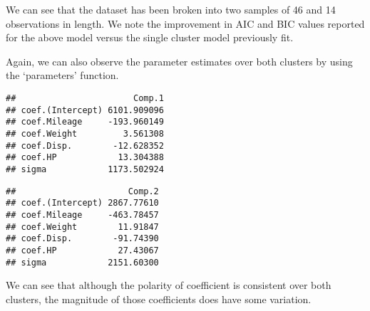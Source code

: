 \documentclass[]{article}
\begin{document}
We can see that the dataset has been broken into two samples of 46 and
14 observations in length. We note the improvement in AIC and BIC values
reported for the above model versus the single cluster model previously
fit.

Again, we can also observe the parameter estimates over both clusters by
using the `parameters' function.

\begin{verbatim}
##                       Comp.1
## coef.(Intercept) 6101.909096
## coef.Mileage     -193.960149
## coef.Weight         3.561308
## coef.Disp.        -12.628352
## coef.HP            13.304388
## sigma            1173.502924
\end{verbatim}

\begin{verbatim}
##                      Comp.2
## coef.(Intercept) 2867.77610
## coef.Mileage     -463.78457
## coef.Weight        11.91847
## coef.Disp.        -91.74390
## coef.HP            27.43067
## sigma            2151.60300
\end{verbatim}

We can see that although the polarity of coefficient is consistent over
both clusters, the magnitude of those coefficients does have some
variation.
\end{document}
